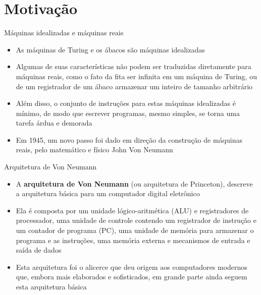 \section{Motivação}

\begin{frame}[fragile]{Máquinas idealizadas e máquinas reais}

    \begin{itemize}
        \item As máquinas de Turing e os ábacos são máquinas idealizadas

        \item Algumas de suas características não podem ser traduzidas diretamente
            para máquinas reais, como o fato da fita ser infinita em um máquina de Turing, ou
            de um registrador de um ábaco armazenar um inteiro de tamanho arbitrário

        \item Além disso, o conjunto de instruções para estas máquinas idealizadas é mínimo,
            de modo que escrever programas, mesmo simples, se torna uma tarefa árdua e demorada

        \item Em 1945, um novo passo foi dado em direção da construção de máquinas reais, pelo
            matemático e físico John Von Neumann
    \end{itemize}

\end{frame}

\begin{frame}[fragile]{Arquitetura de Von Neumann}

    \begin{itemize}
        \item A \textbf{arquitetura de Von Neumann} (ou arquitetura de Princeton), descreve a 
            arquitetura básica para um computador digital eletrônico

        \item Ela é composta por um unidade lógico-aritmética (ALU) e registradores de processador,
            uma unidade de controle contendo um registrador de instrução e um contador de 
            programa (PC), uma unidade de memória para armazenar o programa e as instruções, uma
            memória externa e mecanismos de entrada e saída de dados

        \item Esta arquitetura foi o alicerce que deu origem aos computadores modernos que, 
            embora mais elaborados e sofisticados, em grande parte ainda seguem esta arquitetura
            básica
    \end{itemize}

\end{frame}

